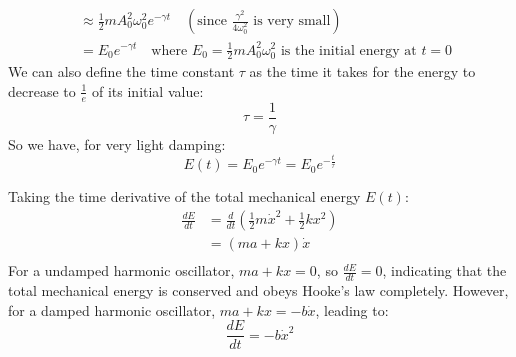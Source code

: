 \documentclass[11pt]{report}
\begin{document}
\begin{definition}
\begin{align*}
             &\approx \frac{1}{2}m A_0^2 \omega_0^2 e^{-\gamma t} \quad (\text{since } \frac{\gamma^2}{4\omega_0^2} \text{ is very small}) \\
             &= E_0 e^{-\gamma t} \quad \text{where } E_0 = \frac{1}{2}m A_0^2 \omega_0^2 \text{ is the initial energy at } t=0
    \end{align*}
    We can also define the time constant \( \tau \) as the time it takes for the energy to decrease to \( \frac{1}{e} \) of its initial value:
    \begin{equation}
        \tau = \frac{1}{\gamma}
    \end{equation}
    So we have, for very light damping:
    \begin{equation}
        E(t) = E_0 e^{-\gamma t} = E_0 e^{-\frac{t}{\tau}}
    \end{equation}
\end{definition}



\begin{definition}
    Taking the time derivative of the total mechanical energy \( E(t) \):
    \begin{align*}
        \frac{dE}{dt} &= \frac{d}{dt} \left(\frac{1}{2}m\dot{x}^2 + \frac{1}{2}kx^2 \right) \\
                      &= (ma + kx)\dot{x} \\
    \end{align*}
    For a undamped harmonic oscillator, \( ma + kx = 0 \), so \( \frac{dE}{dt} = 0 \), indicating that the total mechanical energy is conserved and obeys Hooke's law completely. However, for a damped harmonic oscillator, \( ma + kx = -b\dot{x} \), leading to:
    \begin{equation}
        \frac{dE}{dt} = -b\dot{x}^2
    \end{equation}
\end{definition}
\end{document}
